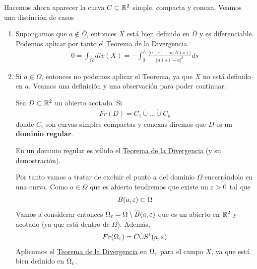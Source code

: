 \begin{observacion}
\begin{enumerate}[start=4]
        Hacemos ahora aparecer la curva $C\subset \mathbb{R}^2$ simple, compacta y conexa. Veamos una distinción de casos
        \begin{enumerate}
            \item Supongamos que $a\notin \overline{\Omega}$, entonces $X$ está bien definido en $\overline{\Omega}$ y es diferenciable. Podemos aplicar por tanto el \hyperref[teo:divergencia]{Teorema de la Divergencia}.
            \begin{gather*}
                0 = \int_\Omega div(X) = - \int_0^L \frac{\langle \alpha(s)-a, N(s)\rangle}{|\alpha(s)-a|^2} ds
            \end{gather*}

            \item Si $a\in \Omega$, entonces no podemos aplicar el Teorema, ya que $X$ no está definido en $a$. Veamos una definición y una observación para poder continuar:
            \begin{definicion}
                Sea $D\subset \mathbb{R}^2$ un abierto acotado. Si 
                \begin{gather*}
                    Fr(D) = C_1 \dot{\cup} ... \dot{\cup} C_k
                \end{gather*}
                donde $C_i$ son curvas simples compactas y conexas diremos que $D$ es un \textbf{dominio regular}.
            \end{definicion}
            \begin{observacion}
                En un dominio regular es válido el \hyperref[teo:divergencia]{Teorema de la Divergencia} (y su demostración).
            \end{observacion}

            Por tanto vamos a tratar de excluir el punto $a$ del dominio $\Omega$ encerrándolo en una curva. Como $a\in \Omega$ que es abierto tendremos que existe un $\varepsilon>0$ tal que 
            \begin{gather*}
                B(a,\varepsilon) \subset \Omega
            \end{gather*}
            Vamos a considerar entonces $\Omega_\varepsilon = \Omega \setminus \overline{B}(a,\varepsilon)$ que es un abierto en $\mathbb{R}^2$ y acotado (ya que está dentro de $\Omega$). Además,
            \begin{gather*}
                Fr(\Omega_\varepsilon) = C \dot{\cup} S^1(a,\varepsilon)
            \end{gather*}
            Aplicamos el \hyperref[teo:divergencia]{Teorema de la Divergencia} en $\Omega_\varepsilon$ para el campo $X$, ya que está bien definido en $\Omega_\varepsilon$.


\end{enumerate}
\end{enumerate}
\end{observacion}
